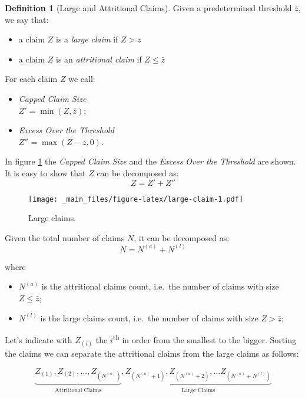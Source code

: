 \documentclass[a4paper, nobind]{templates/ociamthesis}
\providecommand{\tightlist}{%
  \setlength{\itemsep}{0pt}\setlength{\parskip}{0pt}}
\theoremstyle{definition}
\newtheorem{definition}{Definition}[chapter]
\theoremstyle{definition}
\theoremstyle{definition}
\theoremstyle{remark}
\begin{document}
\begin{definition}[Large and Attritional Claims]
\label{def:def-large-claim} \iffalse (Large and Attritional Claims) \fi{} Given a predetermined threshold \(\bar{z}\), we say that:

\begin{itemize}
\item a claim $Z$ is a \textit{large claim} if $Z > \bar{z}$
\item a claim $Z$ is an \textit{attritional claim} if $Z \le \bar{z}$
\end{itemize}

For each claim \(Z\) we call:

\begin{itemize}
\item \textit{Capped Claim Size} \\
      $Z' = \min(Z, \bar{z})$;
\item \textit{Excess Over the Threshold} \\
      $Z'' = \max(Z - \bar{z}, 0)$.
\end{itemize}
\end{definition}

In figure \ref{fig:large-claim} the \emph{Capped Claim Size} and the \emph{Excess Over the Threshold} are shown. It is easy to show that \(Z\) can be decomposed as:
\[Z = Z' + Z''\]

\begin{figure}
\centering
\texttt{[image: \_main\_files/figure-latex/large-claim-1.pdf]}
\caption{\label{fig:large-claim}Large claims.}
\end{figure}

Given the total number of claims \(N\), it can be decomposed as:
\[N = N^{(a)} + N^{(l)}\]

where

\begin{itemize}
\tightlist
\item
  \(N^{(a)}\) is the attritional claims count, i.e.~the number of claims with size \(Z \le \bar{z}\);
\item
  \(N^{(l)}\) is the large claims count, i.e.~the number of claims with size \(Z > \bar{z}\);
\end{itemize}

Let's indicate with \(Z_{(i)}\) the \(i\)\textsuperscript{th} in order from the smallest to the bigger. Sorting the claims we can separate the attritional claims from the large claims as follows:

\[
\underbrace{Z_{(1)}, Z_{(2)}, \dots, Z_{(N^{(a)})}}_{\text{Attritional Claims}},
\underbrace{Z_{(N^{(a)} + 1)}, Z_{(N^{(a)} + 2)}, \dots Z_{(N^{(a)} + N^{(l)})}}_{\text{Large Claims}}
\]
\end{document}
